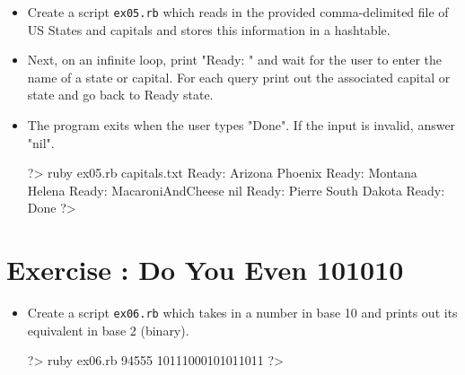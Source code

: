 \documentclass{42-en}
\begin{document}
\begin{itemize}

\item Create a script \texttt{ex05.rb} which reads in the provided comma-delimited file of US States and capitals and stores this information in a hashtable.
\item Next, on an infinite loop, print "Ready: " and wait for the user to enter the name of a state or capital. For each query print out the associated capital or state and go back to Ready state.
\item The program exits when the user types "Done". If the input is invalid, answer "nil".

\begin{42console}
	?> ruby ex05.rb capitals.txt
	Ready: Arizona
	Phoenix
	Ready: Montana
	Helena
	Ready: MacaroniAndCheese
	nil
	Ready: Pierre
	South Dakota
	Ready: Done
	?>
\end{42console}

\end{itemize}


\chapter{Exercise \exercicenumber: Do You Even 101010}

\exnumber{\exercicenumber}

\makeheaderfiles

\begin{itemize}

\item Create a script \texttt{ex06.rb} which takes in a number in base 10 and prints out its equivalent in base 2 (binary).

\begin{42console}
	?> ruby ex06.rb 94555
	10111000101011011
	?>
\end{42console}

\end{itemize}

\end{document}
